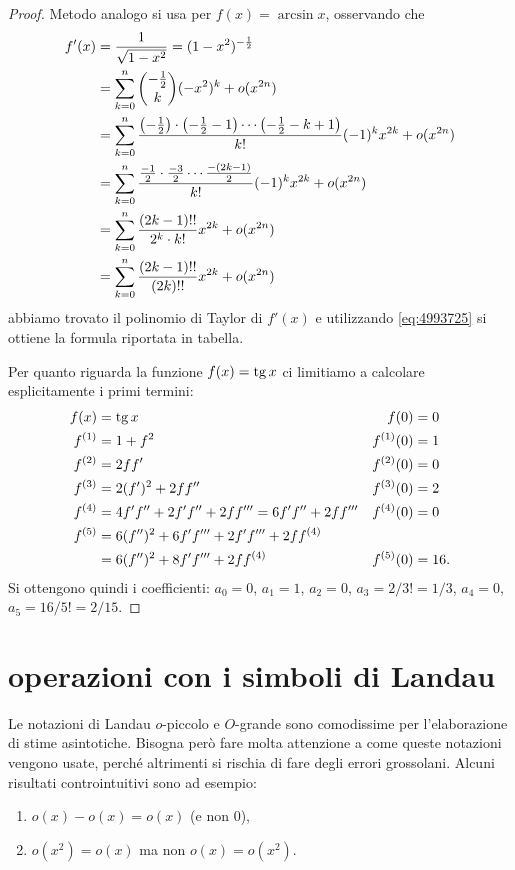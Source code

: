 \begin{proof}
Metodo analogo si usa per $f(x)=\arcsin x$, osservando che
\begin{align*}
  f'(x) &= \frac{1}{\sqrt{1-x^2}}
  = (1-x^2)^{-\frac 1 2} \\
  &= \sum_{k=0}^n {-\frac 1 2 \choose k} (-x^2)^k + o(x^{2n}) \\
  &= \sum_{k=0}^n \frac{{\left( -\frac 1 2 \right)}\cdot {\left( -\frac 1 2 - 1 \right)}\cdots {\left( -\frac 1 2 - k+1 \right)}}{k!}(-1)^k x^{2k} + o(x^{2n}) \\
  &= \sum_{k=0}^n \frac{\frac{-1}{2} \cdot \frac{-3}{2}\cdots \frac{-(2k-1)}{2}}{k!}(-1)^k x^{2k} + o(x^{2n}) \\
  &= \sum_{k=0}^n \frac{(2k-1)!!}{2^k \cdot k!}x^{2k} + o(x^{2n}) \\
  &= \sum_{k=0}^n \frac{(2k-1)!!}{(2k)!!}x^{2k} + o(x^{2n})
 \end{align*}
abbiamo trovato il polinomio di Taylor di $f'(x)$ e utilizzando \eqref{eq:4993725}
si ottiene la formula riportata in tabella.

Per quanto riguarda la funzione $f(x) = \operatorname{tg} x$ ci limitiamo a calcolare esplicitamente i primi termini:
\begin{align*}
  f(x) &= \operatorname{tg} x
  & f(0)&=0\\
  f^{(1)} &= 1+ f^2
  & f^{(1)}(0) &= 1\\
  f^{(2)} &= 2ff'
  & f^{(2)}(0) &= 0 \\
  f^{(3)} &= 2(f')^2 + 2f f''
  & f^{(3)}(0) &= 2 \\
  f^{(4)} &= 4 f' f'' + 2 f' f'' + 2 f f''' = 6 f' f'' + 2 f f'''
   & f^{(4)}(0) &= 0 \\
   f^{(5)} &= 6 (f'')^2 + 6 f' f''' + 2 f' f''' + 2 f f^{(4)}&&\\
           &= 6 (f'')^2 + 8 f' f''' + 2 f f^{(4)}
    & f^{(5)}(0) &= 16.
\end{align*}
Si ottengono quindi i coefficienti:
 $a_0 = 0$, $a_1 = 1$, $a_2 = 0$, $a_3 = 2/3! = 1/3$, $a_4=0$, $a_5 = 16/ 5! = 2/15$.
\end{proof}

\section{operazioni con i simboli di Landau}
\label{sec:landau}

Le
%
%
%
%
%
%
notazioni di Landau $o$-piccolo e $O$-grande sono comodissime per
l'elaborazione di stime asintotiche. Bisogna però fare molta attenzione a come queste notazioni vengono usate, perché altrimenti si rischia di fare degli errori grossolani. Alcuni risultati controintuitivi sono ad esempio:
\begin{enumerate}
\item $o(x) - o(x) = o(x)$ (e non $0$),
\item $o(x^2) = o(x)$ ma non $o(x) = o(x^2)$.
\end{enumerate}

